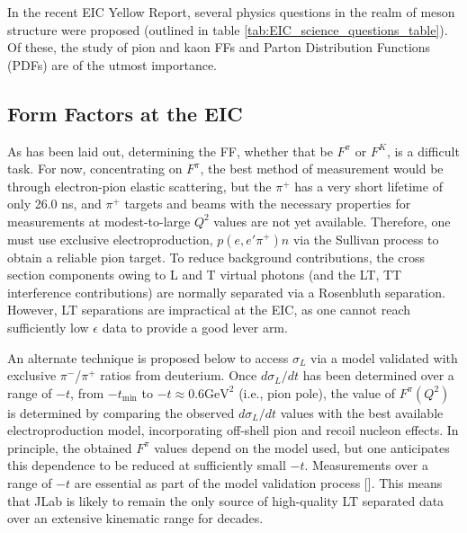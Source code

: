 \documentclass[
]{report}
\begin{document}


In the recent EIC Yellow Report, several physics questions in the realm
of meson structure were proposed (outlined in table
\ref{tab:EIC_science_questions_table}). Of these, the study of pion and
kaon FFs and Parton Distribution Functions (PDFs) are of the utmost
importance.

\hypertarget{form-factors-at-the-eic}{%
\subsection{Form Factors at the EIC}\label{form-factors-at-the-eic}}

As has been laid out, determining the FF, whether that be \(F^\pi\) or
\(F^K\), is a difficult task. For now, concentrating on \(F^\pi\), the
best method of measurement would be through electron-pion elastic
scattering, but the \(\pi^+\) has a very short lifetime of only 26.0 ns,
and \(\pi^+\) targets and beams with the necessary properties for
measurements at modest-to-large \(Q^2\) values are not yet available.
Therefore, one must use exclusive electroproduction, \(p(e, e′\pi^+)n\)
via the Sullivan process to obtain a reliable pion target. To reduce
background contributions, the cross section components owing to L and T
virtual photons (and the LT, TT interference contributions) are normally
separated via a Rosenbluth separation. However, LT separations are
impractical at the EIC, as one cannot reach sufficiently low
\(\epsilon\) data to provide a good lever arm.

An alternate technique is proposed below to access \(\sigma_L\) via a
model validated with exclusive \(\pi^−\)/\(\pi^+\) ratios from
deuterium. Once \(d\sigma_L/dt\) has been determined over a range of
\(−t\), from \(−t_{\mathrm{min}}\) to \(−t\approx 0.6\mathrm{GeV}^2\)
(i.e., pion pole), the value of \(F^\pi(Q^2)\) is determined by
comparing the observed \(d\sigma_L/dt\) values with the best available
electroproduction model, incorporating off-shell pion and recoil nucleon
effects. In principle, the obtained \(F^\pi\) values depend on the model
used, but one anticipates this dependence to be reduced at sufficiently
small \(−t\). Measurements over a range of \(−t\) are essential as part
of the model validation process
{[}\cite{huber_charged_2008, horn_pion_2016, horn_scaling_2008, volmer_measurement_2001, horn_determination_2006, tadevosyan_determination_2007, blok_charged_2008, huber_separated_2014, huber_separated_2015}{]}.
This means that JLab is likely to remain the only source of high-quality
LT separated data over an extensive kinematic range for decades.
\end{document}
